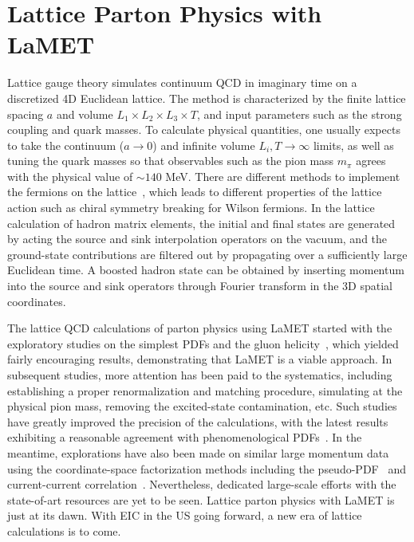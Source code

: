 \section{Lattice Parton Physics with LaMET}
\label{sec:lattice}

Lattice gauge theory simulates continuum QCD in imaginary time on a discretized 4D Euclidean lattice. The method is characterized by the finite lattice spacing $a$ and volume $L_1\times L_2\times L_3\times T$, and input parameters such as the strong coupling and quark masses. To calculate physical quantities, one usually expects to take the continuum ($a\to0$) and infinite volume $L_i, T\to\infty$ limits, as well as tuning the quark masses so that observables such as the pion mass $m_\pi$ agrees with the physical value of $\sim 140$ MeV. There are different methods to implement the fermions on the lattice~\cite{Rothe:1992nt}, which leads to different properties of the lattice action such as chiral symmetry breaking for Wilson fermions. In the lattice calculation of hadron matrix elements, the initial and final states are generated by acting the source and sink interpolation operators on the vacuum, and the ground-state contributions are filtered out by propagating over a sufficiently large Euclidean time. A boosted hadron state can be obtained by inserting momentum into the source and sink operators through Fourier transform in the 3D spatial coordinates.

The lattice QCD calculations of parton physics using LaMET started with the exploratory studies on the simplest PDFs and the gluon helicity~\cite{Lin:2014zya,Alexandrou:2015rja,Yang:2016plb}, which yielded fairly encouraging results, demonstrating that LaMET is a viable approach.
%
In subsequent studies, more attention has been paid to the systematics,
including establishing a proper renormalization and matching procedure, simulating at the physical pion mass, removing the excited-state contamination, etc. Such studies have greatly improved the precision of the calculations, with the latest results exhibiting a reasonable agreement with phenomenological PDFs~\cite{Alexandrou:2018pbm,Lin:2018qky,Alexandrou:2018eet,Izubuchi:2019lyk,Gao:2020ito}. In the meantime, explorations have also been made on similar large momentum data using the coordinate-space factorization methods including the pseudo-PDF~\cite{Orginos:2017kos,Joo:2019bzr,Joo:2019jct,Joo:2020spy} and current-current correlation~\cite{Bali:2019dqc,Sufian:2019bol,Sufian:2020vzb}.
%
Nevertheless, dedicated large-scale efforts with the state-of-art resources are yet to be seen. Lattice parton physics with LaMET is just at its dawn. With EIC
in the US going forward, a new era of lattice calculations is to come.

